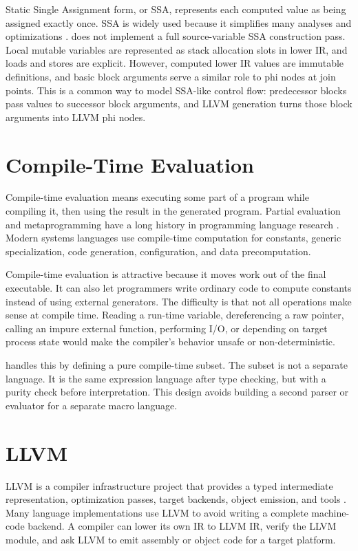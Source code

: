 Static Single Assignment form, or SSA, represents each computed value as being
assigned exactly once. SSA is widely used because it simplifies many analyses
and optimizations \cite{cytron1991ssa}. \epl{} does not implement a full
source-variable SSA construction pass. Local mutable variables are represented as
stack allocation slots in lower IR, and loads and stores are explicit. However,
computed lower IR values are immutable definitions, and basic block arguments
serve a similar role to phi nodes at join points. This is a common way to model
SSA-like control flow: predecessor blocks pass values to successor block
arguments, and LLVM generation turns those block arguments into LLVM phi nodes.

\section{Compile-Time Evaluation}

Compile-time evaluation means executing some part of a program while compiling
it, then using the result in the generated program. Partial evaluation and
metaprogramming have a long history in programming language research
\cite{jones1993partial}. Modern systems languages use compile-time computation
for constants, generic specialization, code generation, configuration, and data
precomputation.

Compile-time evaluation is attractive because it moves work out of the final
executable. It can also let programmers write ordinary code to compute constants
instead of using external generators. The difficulty is that not all operations
make sense at compile time. Reading a run-time variable, dereferencing a raw
pointer, calling an impure external function, performing I/O, or depending on
target process state would make the compiler's behavior unsafe or
non-deterministic.

\epl{} handles this by defining a pure compile-time subset. The subset is not a
separate language. It is the same expression language after type checking, but
with a purity check before interpretation. This design avoids building a second
parser or evaluator for a separate macro language.

\section{LLVM}

LLVM is a compiler infrastructure project that provides a typed intermediate
representation, optimization passes, target backends, object emission, and tools
\cite{lattner2004llvm,llvm_langref}. Many language implementations use LLVM to
avoid writing a complete machine-code backend. A compiler can lower its own IR to
LLVM IR, verify the LLVM module, and ask LLVM to emit assembly or object code
for a target platform.

